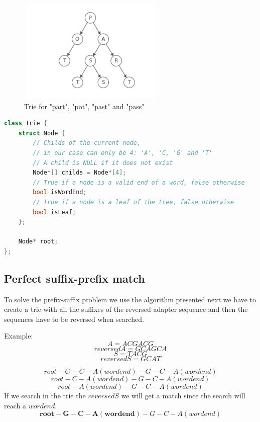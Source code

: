 \documentclass[a4paper,10pt]{article}
\begin{document}
\begin{figure}[H]
    \centering
    \includegraphics[width=7cm, height=5cm]{images/trie.png}
    \caption{Trie for "part", "pot", "past" and "pass"}
    \label{trie-example}
\end{figure}

\begin{lstlisting}[language=c++, caption=Our trie implementation]
class Trie {
    struct Node {
        // Childs of the current node,
        // in our case can only be 4: 'A', 'C, 'G' and 'T'
        // A child is NULL if it does not exist
        Node*[] childs = Node*[4];
        // True if a node is a valid end of a word, false otherwise
        bool isWordEnd;         
        // True if a node is a leaf of the tree, false otherwise
        bool isLeaf;            
    };

    Node* root;
};
\end{lstlisting}


\subsection{Perfect suffix-prefix match}

To solve the prefix-suffix problem we use the algorithm presented next we have to create a trie with all the suffixes of the reversed adapter sequence and then the sequences have to be reversed when searched.

Example:
$$ A = ACGACG $$
$$ reversedA = GCAGCA $$
$$ S = TACG $$
$$ reversedS = GCAT $$

$$root-G-C-A(word end)-G-C-A(wordend)$$
$$root-C-A(wordend)-G-C-A(wordend)$$
$$root-A(wordend)-G-C-A(wordend)$$
If we search in the trie the $reversedS$ we will get a match since the search will reach a $word end$.
$$\mathbf{root-G-C-A(word end)}-G-C-A(wordend)$$
\end{document}
